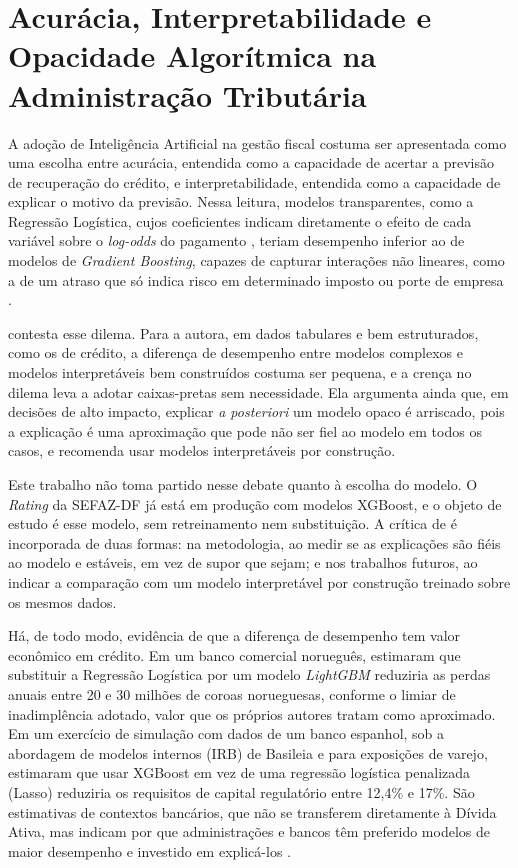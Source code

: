\section{Acurácia, Interpretabilidade e Opacidade Algorítmica na Administração Tributária}
\label{sec:tradeoff}

A adoção de Inteligência Artificial na gestão fiscal costuma ser apresentada como uma escolha entre acurácia, entendida como a capacidade de acertar a previsão de recuperação do crédito, e interpretabilidade, entendida como a capacidade de explicar o motivo da previsão. Nessa leitura, modelos transparentes, como a Regressão Logística, cujos coeficientes indicam diretamente o efeito de cada variável sobre o \textit{log-odds} do pagamento \cite{hastieElementsStatisticalLearning2009}, teriam desempenho inferior ao de modelos de \textit{Gradient Boosting}, capazes de capturar interações não lineares, como a de um atraso que só indica risco em determinado imposto ou porte de empresa \cite{zouInterpretableCreditScoring2025}.

 contesta esse dilema. Para a autora, em dados tabulares e bem estruturados, como os de crédito, a diferença de desempenho entre modelos complexos e modelos interpretáveis bem construídos costuma ser pequena, e a crença no dilema leva a adotar caixas-pretas sem necessidade. Ela argumenta ainda que, em decisões de alto impacto, explicar \textit{a posteriori} um modelo opaco é arriscado, pois a explicação é uma aproximação que pode não ser fiel ao modelo em todos os casos, e recomenda usar modelos interpretáveis por construção.

Este trabalho não toma partido nesse debate quanto à escolha do modelo. O \textit{Rating} da SEFAZ-DF já está em produção com modelos XGBoost, e o objeto de estudo é esse modelo, sem retreinamento nem substituição. A crítica de  é incorporada de duas formas: na metodologia, ao medir se as explicações são fiéis ao modelo e estáveis, em vez de supor que sejam; e nos trabalhos futuros, ao indicar a comparação com um modelo interpretável por construção treinado sobre os mesmos dados.

Há, de todo modo, evidência de que a diferença de desempenho tem valor econômico em crédito. Em um banco comercial norueguês,  estimaram que substituir a Regressão Logística por um modelo \textit{LightGBM} reduziria as perdas anuais entre 20 e 30 milhões de coroas norueguesas, conforme o limiar de inadimplência adotado, valor que os próprios autores tratam como aproximado. Em um exercício de simulação com dados de um banco espanhol, sob a abordagem de modelos internos (IRB) de Basileia e para exposições de varejo,  estimaram que usar XGBoost em vez de uma regressão logística penalizada (Lasso) reduziria os requisitos de capital regulatório entre 12,4\% e 17\%. São estimativas de contextos bancários, que não se transferem diretamente à Dívida Ativa, mas indicam por que administrações e bancos têm preferido modelos de maior desempenho e investido em explicá-los \cite{schmittExplainableAutomatedMachine2024}.



